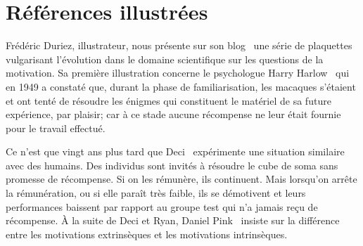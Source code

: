 \section{Références illustrées}\label{sec:illus}
    Frédéric Duriez, illustrateur, nous présente sur son blog~ une série de plaquettes vulgarisant l'évolution dans le domaine scientifique sur les questions de la motivation.
    Sa première illustration concerne le psychologue Harry Harlow~ qui en 1949 a constaté que, durant la phase de familiarisation, les macaques s'étaient  et ont tenté de résoudre les énigmes qui constituent le matériel de sa future expérience, par plaisir; car à ce stade aucune récompense ne leur était fournie pour le travail effectué.\par%
    Ce n'est que vingt ans plus tard que Deci~ expérimente une situation similaire avec des humains. Des individus sont invités à résoudre le cube de soma sans promesse de récompense. Si on les rémunère, ils continuent.
    Mais lorsqu'on arrête la rémunération, ou si elle paraît très faible, ils se démotivent et leurs performances baissent par rapport au groupe test qui n'a jamais reçu de récompense.
    À la suite de Deci et Ryan, Daniel Pink~ insiste sur la différence entre les motivations extrinsèques et les motivations intrinsèques.
